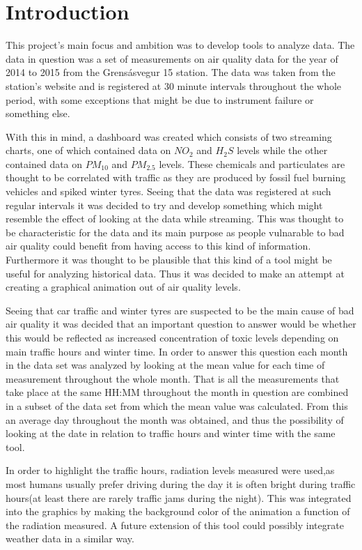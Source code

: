 \documentclass[12pt, a4paper]{article}
\begin{document}
\section{Introduction}
This project's main focus and ambition was to develop tools to analyze data. The data in question was a set of measurements on air quality data for the year of 2014 to 2015 from the Grensásvegur 15 station.
The data was taken from the station's website and is registered at 30 minute intervals throughout the whole period, with some exceptions that might be due to instrument failure or something else.


With this in mind, a dashboard was created which consists of two streaming charts, one of which contained data on \(NO_2\) and \(H_2S\) levels while the other contained data on \(PM_{10}\) and \(PM_{2.5}\) levels.
These chemicals and particulates are thought to be correlated with traffic as they are produced by fossil fuel burning vehicles and spiked winter tyres. 
Seeing that the data was registered at such regular intervals it was decided to try and develop something which might resemble the effect of looking at the data while streaming. 
This was thought to be characteristic for the data and its main purpose as people vulnarable to bad air quality could benefit from having access to this kind of information.
Furthermore it was thought to be plausible that this kind of a tool might be useful for analyzing historical data.
Thus it was decided to make an attempt at creating a graphical animation out of air quality levels.  


Seeing that car traffic and winter tyres are suspected to be the main cause of bad air quality it was decided that an important question to answer would be whether this would be reflected 
as increased concentration of toxic levels depending on main traffic hours and winter time.
In order to answer this question each month in the data set was analyzed by looking at the mean value for each time of measurement throughout the whole month. 
That is all the measurements that take place at the same HH:MM throughout the month in question are combined in a subset of the data set from which the 
mean value was calculated. From this an average day throughout the month was obtained, and thus the possibility of looking at the date in relation to traffic hours and winter time with the same tool.


In order to highlight the traffic hours, radiation levels measured were used,as most humans usually prefer driving during the day it is often bright during traffic hours(at least there are rarely traffic jams during the night).
This was integrated into the graphics by making the background color of the animation a function of the radiation measured. A future extension of this tool could possibly integrate weather data in a similar way.
\end{document}
